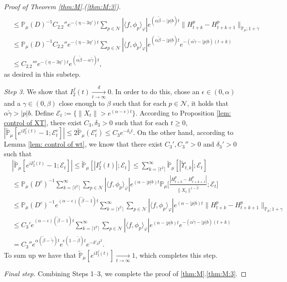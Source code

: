 \documentclass[12pt,a4paper]{amsart}
\theoremstyle{plain}
\theoremstyle{definition}
\numberwithin{equation}{section}
\begin{document}
\begin{proof}[Proof of Theorem \ref{thm:M}.(\ref{thm:M:3})]
\begin{align}
    \\ & \leq \mathbb P_{\mu}(D)^{-1} C_{2.2}'' e^{- (\eta - 3\eta') t}\sum_{p\in \mathcal {N}} |\langle f,\phi_p\rangle_\varphi|  e^{(\alpha \tilde \beta  -|p|b)t} \| H_{t+k}^p-H_{t+k+1}^p \|_{\mathbb P_\mu; 1+\gamma}
    \\&\leq  \mathbb P_{\mu}(D)^{-1} C_{2.2}'' e^{- (\eta - 3\eta') t}\sum_{p\in \mathcal N} |\langle f,\phi_p\rangle_\varphi|  e^{(\alpha \tilde \beta  -|p|b)t} e^{-(\alpha \tilde \gamma - |p|b)(t+k)} \\
    &  \leq  C_{2.2}''' e^{- (\eta - 3\eta') t} e^{(\alpha \tilde \beta - \alpha \tilde \gamma)t},
  \end{align}
  as desired in this substep.

  \emph{Step 3.} We show that $I^f_2(t) \xrightarrow[t\to \infty]{d} 0$.
  In order to do this, chose an $\epsilon \in (0,\alpha)$ and a $\gamma \in (0,\beta)$ close enough to $\beta$ such that for each $p\in \mathcal N$, it holds that $\alpha \tilde \gamma > |p|b$.
  Define $\mathcal E_t:= \{\|X_t\| > e^{(\alpha - \epsilon)t}\}$.
  According to Proposition \ref{lem: control of XT}, there exist $C_3, \delta_3 > 0$ such that for each $t\geq 0$, $|\widetilde {\mathbb {P}}_\mu[e^{i I_2^f(t)} - 1; \mathcal E_t^c]|\leq 2\widetilde {\mathbb {P}}_\mu(\mathcal E_t^c) \leq C_3 e^{- \delta_3 t}$.
  On the other hand, according to Lemma \ref{lem: control of wt}, we know that there exist $C_3',C_3''>0$ and $\delta_3'>0$ such that
  \begin{align}
    & |\widetilde {\mathbb {P}}_\mu[e^{i I_{2}^{f}(t)} - 1; \mathcal {E}_t]|
      \leq  \widetilde {\mathbb {P}}_\mu[ | I_{2}^{f}(t)|; \mathcal {E}_t]
      \leq \sum_{k = \lceil t^2\rceil}^\infty \widetilde {\mathbb {P}}_\mu[ |\widetilde {\Upsilon}_{t,k}|; \mathcal {E}_t]
    \\ & \leq \mathbb P_\mu(D^c)^{-1} \sum_{k = \lceil t^2\rceil}^\infty \sum_{p \in \mathcal N} |\langle f,\phi_p\rangle_\varphi| e^{(\alpha - |p|b)t}\mathbb {P}_\mu\Big[\frac{ |H_{t+k}^p - H_{t+k+1}^p|}{\|X_t\|^{1- \tilde \beta}}; \mathcal E_t\Big]
    \\ & \leq \mathbb P_\mu(D^c)^{-1} e^{(\alpha - \epsilon) (\tilde \beta - 1) t} \sum_{k = \lceil t^2\rceil}^\infty \sum_{p \in \mathcal N} |\langle f,\phi_p\rangle_\varphi| e^{(\alpha - |p|b)t}\|H_{t+k}^p - H_{t+k+1}^p\|_{\mathbb P_\mu; 1+\gamma}
    \\ & \leq C_3' e^{(\alpha - \epsilon) (\tilde \beta - 1) t} \sum_{k = \lceil t^2\rceil}^\infty \sum_{p \in \mathcal N} |\langle f,\phi_p\rangle_\varphi| e^{(\alpha - |p|b)t} e^{- (\alpha \tilde \gamma - |p|b)(t+k)}
    \\ & = C_3'' e^{ \alpha (\tilde \beta - \tilde \gamma) t } e^{ \epsilon (1 - \tilde \beta) t}e^{- \delta'_3 t^2}.
  \end{align}
  To sum up we have that $\widetilde {\mathbb P}_\mu[e^{iI_2^f(t)}] \xrightarrow[t\to \infty]{} 1$, which completes this step.

  \emph{Final step.} Combining Steps 1--3, we complete the proof of \ref{thm:M}.\eqref{thm:M:3}.
\end{proof}
\end{document}
